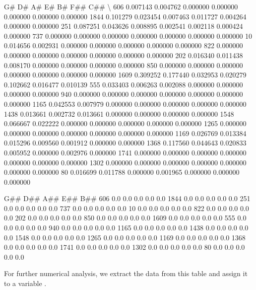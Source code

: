 \documentclass[letterpaper,10pt,english]{sphinxmanual}
\begin{document}
{\begin{sphinxVerbatim}[commandchars=\\\{\}]
            G\#        D\#        A\#        E\#        B\#       F\#\#       C\#\#  \textbackslash{}
606   0.007143  0.004762  0.000000  0.000000  0.000000  0.000000  0.000000
1844  0.101279  0.023454  0.007463  0.011727  0.004264  0.000000  0.000000
251   0.087251  0.043626  0.008895  0.002541  0.002118  0.000424  0.000000
737   0.000000  0.000000  0.000000  0.000000  0.000000  0.000000  0.000000
10    0.014656  0.002931  0.000000  0.000000  0.000000  0.000000  0.000000
822   0.000000  0.000000  0.000000  0.000000  0.000000  0.000000  0.000000
202   0.016340  0.011438  0.008170  0.000000  0.000000  0.000000  0.000000
850   0.000000  0.000000  0.000000  0.000000  0.000000  0.000000  0.000000
1609  0.309252  0.177440  0.032953  0.020279  0.102662  0.016477  0.010139
555   0.033403  0.006263  0.002088  0.000000  0.000000  0.000000  0.000000
940   0.000000  0.000000  0.000000  0.000000  0.000000  0.000000  0.000000
1165  0.042553  0.007979  0.000000  0.000000  0.000000  0.000000  0.000000
1438  0.013661  0.002732  0.013661  0.000000  0.000000  0.000000  0.000000
1548  0.066667  0.022222  0.000000  0.000000  0.000000  0.000000  0.000000
1265  0.000000  0.000000  0.000000  0.000000  0.000000  0.000000  0.000000
1169  0.026769  0.013384  0.015296  0.009560  0.001912  0.000000  0.000000
1368  0.117560  0.044643  0.020833  0.005952  0.000000  0.002976  0.000000
1741  0.000000  0.000000  0.000000  0.000000  0.000000  0.000000  0.000000
1302  0.000000  0.000000  0.000000  0.000000  0.000000  0.000000  0.000000
80    0.016699  0.011788  0.000000  0.001965  0.000000  0.000000  0.000000

      G\#\#  D\#\#  A\#\#  E\#\#  B\#\#
606   0.0  0.0  0.0  0.0  0.0
1844  0.0  0.0  0.0  0.0  0.0
251   0.0  0.0  0.0  0.0  0.0
737   0.0  0.0  0.0  0.0  0.0
10    0.0  0.0  0.0  0.0  0.0
822   0.0  0.0  0.0  0.0  0.0
202   0.0  0.0  0.0  0.0  0.0
850   0.0  0.0  0.0  0.0  0.0
1609  0.0  0.0  0.0  0.0  0.0
555   0.0  0.0  0.0  0.0  0.0
940   0.0  0.0  0.0  0.0  0.0
1165  0.0  0.0  0.0  0.0  0.0
1438  0.0  0.0  0.0  0.0  0.0
1548  0.0  0.0  0.0  0.0  0.0
1265  0.0  0.0  0.0  0.0  0.0
1169  0.0  0.0  0.0  0.0  0.0
1368  0.0  0.0  0.0  0.0  0.0
1741  0.0  0.0  0.0  0.0  0.0
1302  0.0  0.0  0.0  0.0  0.0
80    0.0  0.0  0.0  0.0  0.0
\end{sphinxVerbatim}
}

For further numerical analysis, we extract the data from this table and assign it to a variable .

{
\begin{sphinxVerbatim}[commandchars=\\\{\}]
\llap{\color{nbsphinxin}[14]:\,\hspace{\fboxrule}\hspace{\fboxsep}}
  

 
\end{sphinxVerbatim}
}
\end{document}
